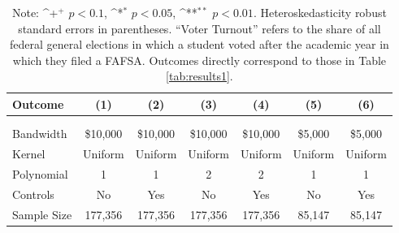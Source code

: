 \documentclass[12pt,letterpaper,oneside]{book}
\newcommand{\basepath}{g:/My Drive/Grad School}
\newcommand{\basepath}{basepath}
\begin{document}
    \begin{table}[h!]\centering
    \def\sym#1{\ifmmode^{#1}\else\(^{#1}\)\fi}
    \caption{Turnout Effects of 2017-2019 Cal Grants Conditional on Voter Registration\label{tab:conditional_turnout}}
    \begin{tabular}{l*{6}{c}}
        \hline\hline
        Outcome&\multicolumn{1}{c}{(1)}&\multicolumn{1}{c}{(2)}&\multicolumn{1}{c}{(3)}&\multicolumn{1}{c}{(4)}&\multicolumn{1}{c}{(5)}&\multicolumn{1}{c}{(6)}\\
        \hline
        &&&&&&\\


        

        &&&&&&\\

        \hline
        Bandwidth & \$10,000       &   \$10,000        &   \$10,000        &   \$10,000       &   \$5,000        &   \$5,000        \\
        Kernel&   Uniform      &   Uniform        &   Uniform        &   Uniform       &   Uniform       &   Uniform       \\
        Polynomial&   1       &   1        &   2        &   2       &   1       &   1       \\
        Controls&   No       &   Yes        &   No        &   Yes        &   No        &   Yes        \\
        Sample Size      &     177,356    &     177,356    &      177,356     &   177,356  &  85,147     &   85,147    \\
        \hline
    \end{tabular}
    \caption*{\footnotesize Note: \sym{+} \(p<0.1\), \sym{*} \(p<0.05\), \sym{**} \(p<0.01\). Heteroskedasticity robust standard errors in parentheses. ``Voter Turnout'' refers to the share of all federal general elections in which a student voted after the academic year in which they filed a FAFSA. Outcomes directly correspond to those in Table \ref{tab:results1}.}
\end{table}

\clearpage
\end{document}

